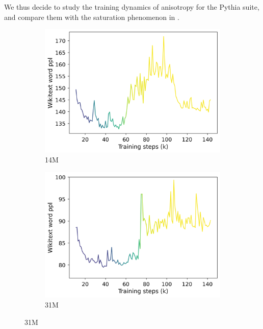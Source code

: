 We thus decide to study the training dynamics of anisotropy for the Pythia suite, and compare them with the saturation phenomenon in .

\begin{figure}[h]
    \centering
    \begin{subfigure}{0.32\columnwidth}
         \includegraphics[width=\linewidth]{sources/part_1/softmax_bottleneck/imgs/anisotropy_explosion_14m.png}
         \caption{14M}
         \label{fig:14M}
    \end{subfigure}
    \begin{subfigure}{0.32\columnwidth}
         \includegraphics[width=\linewidth]{sources/part_1/softmax_bottleneck/imgs/anisotropy_explosion_31m.png}
         \caption{31M}
         \label{fig:31M}
    \end{subfigure}

\end{figure}
